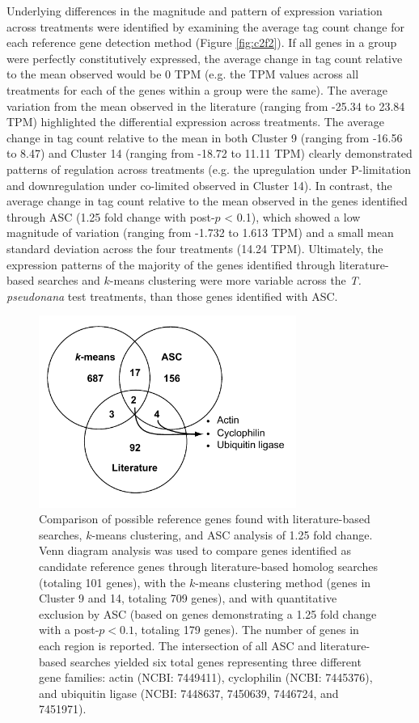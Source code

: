 	Underlying differences in the magnitude and pattern of expression variation across treatments were identified by examining the average tag count change for each reference gene detection method (Figure \ref{fig:c2f2}). If all genes in a group were perfectly constitutively expressed, the average change in tag count relative to the mean observed would be 0 TPM (e.g. the TPM values across all treatments for each of the genes within a group were the same). The average variation from the mean observed in the literature (ranging from -25.34 to 23.84 TPM) highlighted the differential expression across treatments. The average change in tag count relative to the mean in both Cluster 9 (ranging from -16.56 to 8.47) and Cluster 14 (ranging from -18.72 to 11.11 TPM) clearly demonstrated patterns of regulation across treatments (e.g. the upregulation under P-limitation and downregulation under co-limited observed in Cluster 14). In contrast, the average change in tag count relative to the mean observed in the genes identified through ASC (1.25 fold change with post-$p$ < 0.1), which showed a low magnitude of variation (ranging from -1.732 to 1.613 TPM) and a small mean standard deviation across the four treatments (14.24 TPM). Ultimately, the expression patterns of the majority of the genes identified through literature-based searches and $k$-means clustering were more variable across the \textit{T. pseudonana} test treatments, than those genes identified with ASC.\par	
\begin{figure}[h!]
  \centering
    \includegraphics[width=0.75\textwidth]{Images/C2_Figure3_v6_bw.pdf}
    \caption[Comparison of putative reference genes identified through literature, $k$-means clustering, and ASC analysis]{Comparison of possible reference genes found with literature-based searches, $k$-means clustering, and ASC analysis of 1.25 fold change. Venn diagram analysis was used to compare genes identified as candidate reference genes through literature-based homolog searches (totaling 101 genes), with the $k$-means clustering method (genes in Cluster 9 and 14, totaling 709 genes), and with quantitative exclusion by ASC (based on genes demonstrating a 1.25 fold change with a post-$p < 0.1$, totaling 179 genes). The number of genes in each region is reported. The intersection of all ASC and literature-based searches yielded six total genes representing three different gene families: actin (NCBI: 7449411), cyclophilin (NCBI: 7445376), and ubiquitin ligase (NCBI: 7448637, 7450639, 7446724, and 7451971). }
  \label{fig:c2f3}
\end{figure} 
